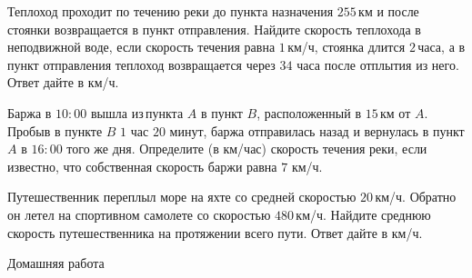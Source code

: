 \begin{class}[number=1]
\begin{listofex}
		\item Теплоход проходит по течению реки до пункта назначения \( 255 \) км и после стоянки возвращается в пункт отправления. Найдите скорость теплохода в неподвижной воде, если скорость течения равна \( 1 \) км/ч, стоянка длится \( 2 \) часа, а в пункт отправления теплоход возвращается через \( 34 \) часа после отплытия из него. Ответ дайте в км/ч.
		\item Баржа в \( 10:00 \) вышла из пункта \( A \) в пункт \( B \), расположенный в \( 15 \) км от \( A \). Пробыв в пункте \( B \) \( 1 \) час \( 20 \) минут, баржа отправилась назад и вернулась в пункт \( A \) в \( 16:00 \) того же дня. Определите (в км/час) скорость течения реки, если известно, что собственная скорость баржи равна \( 7 \) км/ч.
		\item Путешественник переплыл море на яхте со средней скоростью \( 20 \) км/ч. Обратно он летел на спортивном самолете со скоростью \( 480 \) км/ч. Найдите среднюю скорость путешественника на протяжении всего пути. Ответ дайте в км/ч.
	\end{listofex}
\end{class}

\begin{homework}[number=1]
		\begin{listofex}
			\item Домашняя работа
		\end{listofex}
\end{homework}

